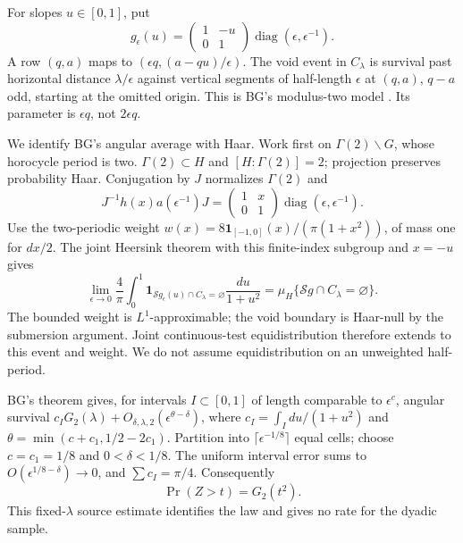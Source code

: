 \documentclass[11pt,a4paper]{article}
\numberwithin{equation}{section}
\theoremstyle{remark}
\begin{document}
For slopes $u\in[0,1]$, put
\[
g_\epsilon(u)=\begin{pmatrix}1&-u\\0&1\end{pmatrix}
\operatorname{diag}(\epsilon,\epsilon^{-1}).
\]
A row $(q,a)$ maps to $(\epsilon q,(a-qu)/\epsilon)$.
The void event in $C_\lambda$ is survival past horizontal distance
$\lambda/\epsilon$ against vertical segments of half-length $\epsilon$
at $(q,a)$, $q-a$ odd, starting at the omitted origin. This is BG's
modulus-two model \cite[Theorem~1.1(i), p.~1045; definition, p.~1044]{BG}.
Its parameter is $\epsilon q$, not $2\epsilon q$.

We identify BG's angular average with Haar. Work first on
$\Gamma(2)\backslash G$, whose horocycle period is two.
$\Gamma(2)\subset H$ and $[H:\Gamma(2)]=2$; projection preserves
probability Haar. Conjugation by $J$ normalizes $\Gamma(2)$ and
\[
J^{-1}h(x)a(\epsilon^{-1})J
=\begin{pmatrix}1&x\\0&1\end{pmatrix}
\operatorname{diag}(\epsilon,\epsilon^{-1}).
\]
Use the two-periodic weight
$w(x)=8\mathbf1_{[-1,0]}(x)/(\pi(1+x^2))$, of mass one for $dx/2$.
The joint Heersink theorem with this finite-index subgroup and $x=-u$
gives
\begin{equation}\label{eq:angularHaar}
\lim_{\epsilon\to0}\frac4\pi\int_0^1
\mathbf1_{\mathcal Sg_\epsilon(u)\cap C_\lambda=\varnothing}
\frac{du}{1+u^2}
=\mu_H\{\mathcal Sg\cap C_\lambda=\varnothing\}.
\end{equation}
The bounded weight is $L^1$-approximable; the void boundary is
Haar-null by the submersion argument. Joint continuous-test
equidistribution therefore extends to this event and weight. We do
not assume equidistribution on an unweighted half-period.

BG's theorem gives, for intervals $I\subset[0,1]$ of length comparable
to $\epsilon^c$, angular survival
$c_I G_2(\lambda)+O_{\delta,\lambda,2}(\epsilon^{\theta-\delta})$,
where $c_I=\int_Idu/(1+u^2)$ and
$\theta=\min(c+c_1,1/2-2c_1)$. Partition into
$\lceil\epsilon^{-1/8}\rceil$ equal cells; choose $c=c_1=1/8$ and
$0<\delta<1/8$. The uniform interval error sums to
$O(\epsilon^{1/8-\delta})\to0$, and $\sum c_I=\pi/4$.
Consequently
\begin{equation}\label{eq:BGlaw}
\boxed{\Pr(Z>t)=G_2(t^2).}
\end{equation}
This fixed-$\lambda$ source estimate identifies the law and gives no
rate for the dyadic sample.
\end{document}
